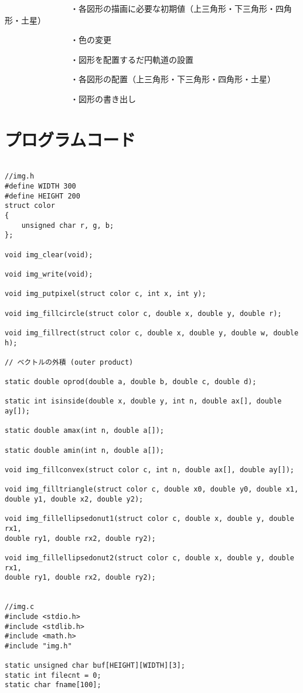 \documentclass[12pt,a4j]{jarticle}
\begin{document}
　　　　　　　　・各図形の描画に必要な初期値（上三角形・下三角形・四角形・土星）
        
　　　　　　　　・色の変更
        
　　　　　　　　・図形を配置するだ円軌道の設置
        
　　　　　　　　・各図形の配置（上三角形・下三角形・四角形・土星）
        
　　　　　　　　・図形の書き出し

\section{プログラムコード}

\begin{verbatim}

//img.h
#define WIDTH 300
#define HEIGHT 200
struct color
{
    unsigned char r, g, b;
};

void img_clear(void);

void img_write(void);

void img_putpixel(struct color c, int x, int y);

void img_fillcircle(struct color c, double x, double y, double r);

void img_fillrect(struct color c, double x, double y, double w, double h);

// ベクトルの外積 (outer product)

static double oprod(double a, double b, double c, double d);

static int isinside(double x, double y, int n, double ax[], double ay[]);

static double amax(int n, double a[]);

static double amin(int n, double a[]);

void img_fillconvex(struct color c, int n, double ax[], double ay[]);

void img_filltriangle(struct color c, double x0, double y0, double x1, 
double y1, double x2, double y2);

void img_fillellipsedonut1(struct color c, double x, double y, double rx1,
double ry1, double rx2, double ry2);

void img_fillellipsedonut2(struct color c, double x, double y, double rx1,
double ry1, double rx2, double ry2);


//img.c
#include <stdio.h>
#include <stdlib.h>
#include <math.h>
#include "img.h"

static unsigned char buf[HEIGHT][WIDTH][3];
static int filecnt = 0;
static char fname[100];


\end{verbatim}
\end{document}
